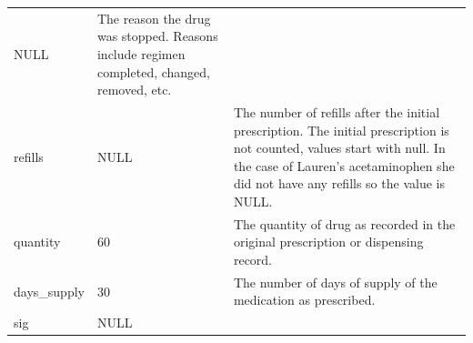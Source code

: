 \documentclass[11pt]{book}
\begin{document}
\begin{longtable}[]{@{}lll@{}}
\begin{minipage}[t]{0.16\columnwidth}
NULL\strut
\end{minipage} & \begin{minipage}[t]{0.48\columnwidth}\raggedright\strut
The reason the drug was stopped. Reasons include regimen completed,
changed, removed, etc.\strut
\end{minipage}\tabularnewline
\begin{minipage}[t]{0.28\columnwidth}\raggedright\strut
refills\strut
\end{minipage} & \begin{minipage}[t]{0.16\columnwidth}\raggedright\strut
NULL\strut
\end{minipage} & \begin{minipage}[t]{0.48\columnwidth}\raggedright\strut
The number of refills after the initial prescription. The initial
prescription is not counted, values start with null. In the case of
Lauren's acetaminophen she did not have any refills so the value is
NULL.\strut
\end{minipage}\tabularnewline
\begin{minipage}[t]{0.28\columnwidth}\raggedright\strut
quantity\strut
\end{minipage} & \begin{minipage}[t]{0.16\columnwidth}\raggedright\strut
60\strut
\end{minipage} & \begin{minipage}[t]{0.48\columnwidth}\raggedright\strut
The quantity of drug as recorded in the original prescription or
dispensing record.\strut
\end{minipage}\tabularnewline
\begin{minipage}[t]{0.28\columnwidth}\raggedright\strut
days\_supply\strut
\end{minipage} & \begin{minipage}[t]{0.16\columnwidth}\raggedright\strut
30\strut
\end{minipage} & \begin{minipage}[t]{0.48\columnwidth}\raggedright\strut
The number of days of supply of the medication as prescribed.\strut
\end{minipage}\tabularnewline
\begin{minipage}[t]{0.28\columnwidth}\raggedright\strut
sig\strut
\end{minipage} & \begin{minipage}[t]{0.16\columnwidth}\raggedright\strut
NULL\strut
\end{minipage} & \begin{minipage}[t]{0.48\columnwidth}\raggedright\strut

\end{minipage}
\end{longtable}
\end{document}
